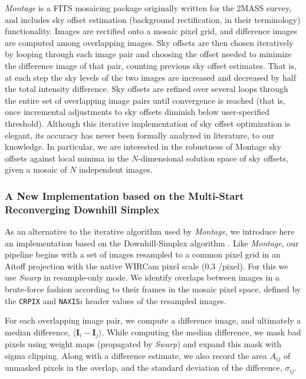 \documentclass[iop]{emulateapj}
\newcommand{\vect}[1]{\boldsymbol{#1}} %
\newcommand{\sw}[1]{\textit{#1}} %
\begin{document}
\sw{Montage} is a FITS mosaicing package \citep{Berriman:2008} originally written for the 2MASS survey, and includes sky offset estimation (background rectification, in their terminology) functionality.
Images are rectified onto a mosaic pixel grid, and difference images are computed among overlapping images.
Sky offsets are then chosen iteratively by looping through each image pair and choosing the offset needed to minimize the difference image of that pair, counting previous sky offset estimates.
That is, at each step the sky levels of the two images are increased and decreased by half the total intensity difference.
Sky offsets are refined over several loops through the entire set of overlapping image pairs until convergence is reached (that is, once incremental adjustments to sky offsets diminish below user-specified threshold).
Although this iterative implementation of sky offset optimization is elegant, its accuracy has never been formally analyzed in literature, to our knowledge.
In particular, we are interested in the robustness of Montage sky offsets against local minima in the $N$-dimensional solution space of sky offsets, given a mosaic of $N$ independent images.

\subsubsection{A New Implementation based on the Multi-Start Reconverging Downhill Simplex}
\label{sec:msrnm_algo}

As an alternative to the iterative algorithm used by \sw{Montage}, we introduce here an implementation based on the Downhill-Simplex algorithm \cite[][hereafter, NM]{Nelder:1965}.
Like \sw{Montage}, our pipeline begins with a set of images resampled to a common pixel grid in an Aitoff projection with the native WIRCam pixel scale (0.3 \arcsec/pixel).
For this we use \sw{Swarp} \citep{Bertin:2002} in resample-only mode.
We identify overlaps between images in a brute-force fashion according to their frames in the mosaic pixel space, defined by the \texttt{CRPIX} and \texttt{NAXIS}$i$ header values of the resampled images.

For each overlapping image pair, we compute a difference image, and ultimately a median difference, $\langle \vect{I}_i - \vect{I}_j \rangle$.
While computing the median difference, we mask bad pixels using weight maps (propagated by \sw{Swarp}) and expand this mask with sigma clipping.
Along with a difference estimate, we also record the area $A_{ij}$ of unmasked pixels in the overlap, and the standard deviation of the difference, $\sigma_{ij}$.
\end{document}
